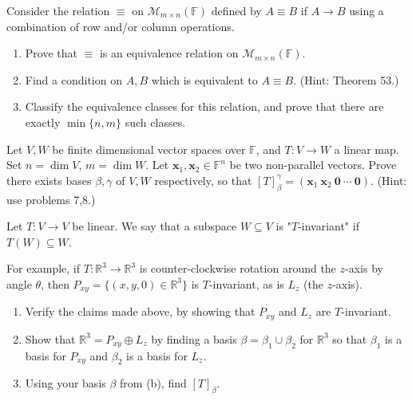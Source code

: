 \documentclass{eh-homework}
\begin{document}
    \begin{question}{9}
        Consider the relation \( \equiv \) on \( \mathcal{M}_{m \times n}(\mathbb{F}) \) defined by \( A \equiv B \) if \( A \to B \) using a combination of row and/or column operations.

        \begin{enumerate}
            \item Prove that \( \equiv \) is an equivalence relation on \( \mathcal{M}_{m \times n}(\mathbb{F}) \).
            \item Find a condition on \( A, B \) which is equivalent to \( A \equiv B \). (Hint: Theorem 53.)
            \item Classify the equivalence classes for this relation, and prove that there are exactly \( \min\{n, m\} \) such classes.
        \end{enumerate}
    \end{question}

    \begin{question}{10}
        Let \( V, W \) be finite dimensional vector spaces over \( \mathbb{F} \), and \( T : V \to W \) a linear map. Set \( n = \dim V \), \( m = \dim W \). Let \( \mathbf{x}_1, \mathbf{x}_2 \in \mathbb{F}^n \) be two non-parallel vectors. Prove there exists bases \( \beta, \gamma \) of \( V, W \) respectively, so that \( [T]_\beta^\gamma = (\mathbf{x}_1 \ \mathbf{x}_2 \ \mathbf{0} \ \cdots \ \mathbf{0}) \). (Hint: use problems 7,8.)
    \end{question}

    \begin{question}{11}
        Let \( T : V \to V \) be linear. We say that a subspace \( W \subseteq V \) is "\( T \)-invariant" if \( T(W) \subseteq W \).

        For example, if \( T : \mathbb{R}^3 \to \mathbb{R}^3 \) is counter-clockwise rotation around the \( z \)-axis by angle \( \theta \), then \( P_{xy} = \{(x, y, 0) \in \mathbb{R}^3\} \) is \( T \)-invariant, as is \( L_z \) (the \( z \)-axis).

        \begin{enumerate}
            \item Verify the claims made above, by showing that \( P_{xy} \) and \( L_z \) are \( T \)-invariant.
            \item Show that \( \mathbb{R}^3 = P_{xy} \oplus L_z \) by finding a basis \( \beta = \beta_1 \cup \beta_2 \) for \( \mathbb{R}^3 \) so that \( \beta_1 \) is a basis for \( P_{xy} \) and \( \beta_2 \) is a basis for \( L_z \).
            \item Using your basis \( \beta \) from (b), find \( [T]_\beta \).
        \end{enumerate}
    \end{question}
\end{document}
